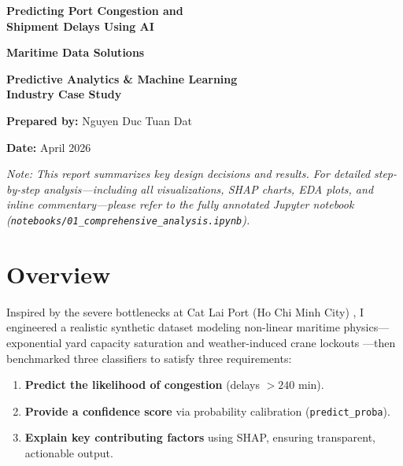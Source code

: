 \documentclass[11pt, a4paper]{article}
\begin{document}
\begin{titlepage}
    \centering
    \vspace*{5cm}
    
    {\Huge \textbf{Predicting Port Congestion and \\ Shipment Delays Using AI}\par}
    \vspace{1.5cm}

    {\LARGE \textbf{Maritime Data Solutions}\par}
    \vspace{1.5cm}
    
    {\Large \textbf{Predictive Analytics \& Machine Learning \\ Industry Case Study}\par}
    \vspace{2cm}
    
    {\Large \textbf{Prepared by:} Nguyen Duc Tuan Dat\par}
    \vspace{0.5cm}
    
    {\large \textbf{Date:} April 2026\par}
    
    \vfill
\end{titlepage}

\tableofcontents
\newpage


\textit{\small Note: This report summarizes key design decisions and results. For detailed step-by-step analysis---including all visualizations, SHAP charts, EDA plots, and inline commentary---please refer to the fully annotated Jupyter notebook (\texttt{notebooks/01\_comprehensive\_analysis.ipynb}).}

\section{Overview}

Inspired by the severe bottlenecks at Cat Lai Port (Ho Chi Minh City) \cite{vietnamnet_catlai}, I engineered a realistic synthetic dataset modeling non-linear maritime physics---exponential yard capacity saturation \cite{mm1_queue} and weather-induced crane lockouts \cite{pema_wind}---then benchmarked three classifiers to satisfy three requirements:
\begin{enumerate}[nosep, leftmargin=1.5em]
    \item \textbf{Predict the likelihood of congestion} (delays $> 240$ min).
    \item \textbf{Provide a confidence score} via probability calibration (\texttt{predict\_proba}).
    \item \textbf{Explain key contributing factors} using SHAP, ensuring transparent, actionable output.
\end{enumerate}
\end{document}
